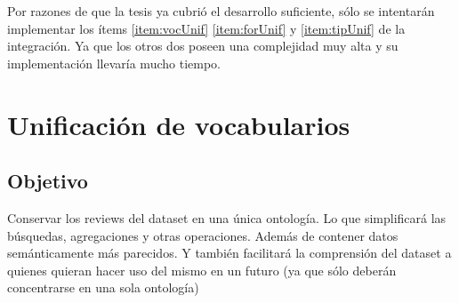 \noindent Por razones de que la tesis ya cubrió el desarrollo suficiente, sólo se intentarán implementar los ítems \ref{item:vocUnif} \ref{item:forUnif} y \ref{item:tipUnif} de la integración. Ya que 
los otros dos poseen una complejidad muy alta y su implementación llevaría mucho tiempo.\\

\section{Unificación de vocabularios}
\label{section:unificacion-vocabularios}

\subsection*{Objetivo} Conservar los reviews del dataset en una única ontología. Lo que simplificará las búsquedas, agregaciones y otras operaciones.
Además de contener datos semánticamente más parecidos. Y también facilitará la comprensión del dataset a quienes quieran hacer uso del mismo
en un futuro (ya que sólo deberán concentrarse en una sola ontología)

